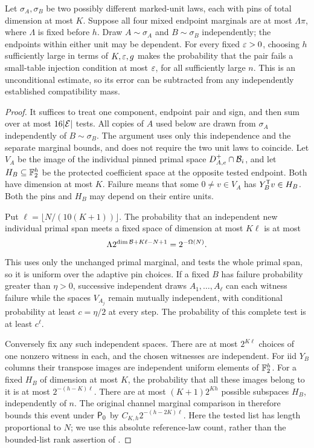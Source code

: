 \begin{lemma}
\label{lem:injection}
Let \(\sigma_A,\sigma_B\) be two possibly different marked-unit
laws, each with pins of total dimension at most \(K\).
Suppose all four mixed endpoint marginals are at most
\(\Lambda\pi\), where \(\Lambda\) is fixed before \(h\).
Draw \(A\sim\sigma_A\) and \(B\sim\sigma_B\) independently;
the endpoints within either unit may be dependent.  For every
fixed \(\varepsilon>0\), choosing \(h\) sufficiently large in terms
of \(K,\varepsilon,g\) makes the probability that the pair fails a
small-table injection condition at most \(\varepsilon\), for all
sufficiently large \(n\).  This is an unconditional estimate,
so its error can be subtracted from any independently
established compatibility mass.
\end{lemma}
\begin{proof}
It suffices to treat one component, endpoint pair and sign, and
then sum over at most \(16|\mathcal E|\) tests.
All copies of \(A\) used below are drawn from \(\sigma_A\)
independently of \(B\sim\sigma_B\).  The argument uses only
this independence and the separate marginal bounds, and does
not require the two unit laws to coincide.  Let \(V_A\) be the image
of the individual pinned primal space \(D_{A,e}^+\cap\mathcal B_i\),
and let \(H_B\subseteq\mathbb F_2^h\) be the protected coefficient space
at the opposite tested endpoint.  Both have dimension at most
\(K\).  Failure means that some \(0\ne v\in V_A\) has
\(Y_B^{\mathsf T} v\in H_B\).  Both the pins and \(H_B\) may depend
on their entire units.

Put \(\ell=\lfloor N/(10(K+1))\rfloor\).  The probability that
an independent new individual primal span meets a fixed space
of dimension at most \(K\ell\) is at most
\[
 \Lambda 2^{\dim\mathcal B+K\ell-N+1}=2^{-\Omega(N)}.
\]
This uses only the unchanged primal marginal, and tests the whole
primal span, so it is uniform over the adaptive pin choices.
If a fixed \(B\) has failure probability greater than
\(\eta>0\), successive independent draws
\(A_1,\ldots,A_\ell\) can each witness failure while the spaces
\(V_{A_j}\) remain mutually independent, with conditional
probability at least \(c=\eta/2\) at every step.  The probability
of this complete test is at least \(c^\ell\).

Conversely fix any such independent spaces.  There are at most
\(2^{K\ell}\) choices of one nonzero witness in each, and the
chosen witnesses are independent.  For iid \(Y_B\) columns their
transpose images are independent uniform elements of \(\mathbb F_2^h\).
For a fixed \(H_B\) of dimension at most \(K\), the probability
that all these images belong to it is at most
\(2^{-(h-K)\ell}\).  There are at most
\((K+1)2^{Kh}\) possible subspaces \(H_B\), independently of
\(n\).  The original channel marginal comparison in
 therefore bounds this event under
\({\mathsf P_0}\) by \(C_{K,h}2^{-(h-2K)\ell}\).
Here the tested list has length proportional to \(N\); we use
this absolute reference-law count, rather than the bounded-list
rank assertion of .


\end{proof}
